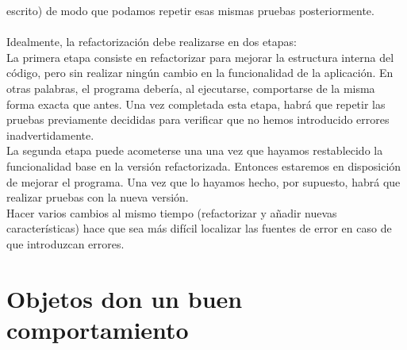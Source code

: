 \documentclass[11pt,a4paper]{article}
\begin{document}
escrito) de modo que podamos repetir esas mismas pruebas posteriormente.\\
\\
Idealmente, la
refactorización debe realizarse en dos etapas:\\
La primera etapa consiste en refactorizar para mejorar la estructura interna del código, pero
sin realizar ningún cambio en la funcionalidad de la aplicación. En otras palabras, el programa
debería, al ejecutarse, comportarse de la misma forma exacta que antes. Una vez completada
esta etapa, habrá que repetir las pruebas previamente decididas para verificar que no hemos
introducido errores inadvertidamente.\\
 La segunda etapa puede acometerse una una vez que hayamos restablecido la funcionalidad base en
 la versión refactorizada. Entonces estaremos en disposición de mejorar el programa. Una vez
 que lo hayamos hecho, por supuesto, habrá que realizar pruebas con la nueva versión.\\
 Hacer varios cambios al mismo tiempo (refactorizar y añadir nuevas características) hace que sea
 más difícil localizar las fuentes de error en caso de que introduzcan errores.

\section{Objetos don un buen comportamiento}
\end{document}

